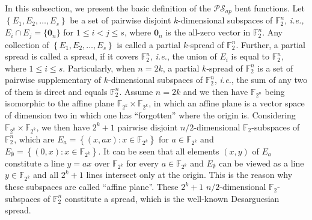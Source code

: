 \documentclass{article}
\newcommand{\F}{\mathbb{F}}
\newcommand{\0}{\textbf{0}}
\newcommand{\1}{\textbf{1}}
\theoremstyle{plain}
\begin{document}
In this subsection, we present the basic definition of the $\mathcal{PS}_{ap}$ bent functions.
Let $\left\{ E_1,E_2,\dots,E_s \right\}$ be a set of pairwise disjoint $k$-dimensional subspaces of $\F_2^n$, {\em i.e.,}
$E_i\cap E_j = \{\bm{0}_n\}$ for $1\le i<j\le s$, where $\bm{0}_n$ is the all-zero vector in $\F_2^n$.
Any collection of $\left\{ E_1,E_2,\dots,E_s \right\}$ is called a partial $k$-spread of $\F_2^n$.
Further, a partial spread is called a spread, if it covers $\F_2^n$, \emph{i.e.}, the union of $E_i$ is equal to $\F_2^n$, where $1\le i\le s$.
Particularly, when $n=2k$, a partial $k$-spread of $\F_2^n$ is a set of pairwise supplementary of $k$-dimensional subspaces of $\F_2^n$,
\emph{i.e.},  the sum of any two of them is direct and equals $\F_2^n$.
Assume $n=2k$ and we then have $\F_{2^n}$ being isomorphic to the affine plane $\F_{2^k}\times\F_{2^k}$,
in which  an affine plane is a vector space of dimension two in which one has ``forgotten'' where the origin is.
Considering $\F_{2^k}\times\F_{2^k}$, we then have $2^k+1$ pairwise disjoint $n/2$-dimensional $\F_2$-subspaces of $\F_2^n$, which are
$E_a=\left\{(x,ax) : x\in\F_{2^k}\right\}$ for $a\in\F_{2^k}$ and $E_{\emptyset}=\left\{(0,x) : x\in\F_{2^k}\right\}$.
It can be seen that all elements $(x,y)$ of $E_a$ constitute a line $y=ax$ over $\F_{2^k}$ for every $a\in\F_{2^k}$ and
$E_{\emptyset}$ can be viewed as a line $y\in\F_{2^k}$ and all $2^k+1$ lines intersect only at the origin.
This is the reason why these subspaces are called ``affine plane''.
These $2^k+1$ $n/2$-dimensional $\F_2$-subspaces of $\F_2^n$ constitute a spread, which is the well-known Desarguesian spread.
\end{document}
